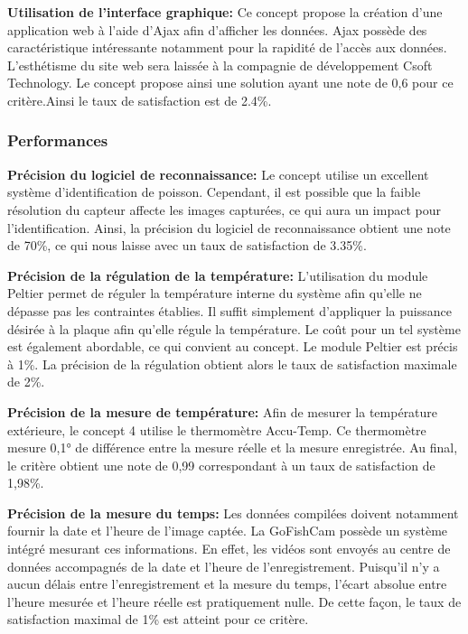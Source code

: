 \textbf{Utilisation de l'interface graphique:} Ce concept propose la création d'une application web à l'aide d'Ajax afin d'afficher les données. Ajax possède des caractéristique intéressante notamment pour la rapidité de l'accès aux données. L'esthétisme du site web sera laissée à la compagnie de développement Csoft Technology. Le concept propose ainsi une solution ayant une note de 0,6 pour ce critère.Ainsi le taux de satisfaction est de 2.4\%.


\subsubsection{Performances}

\textbf{Précision du logiciel de reconnaissance:} Le concept utilise un excellent système d'identification de poisson. Cependant, il est possible que la faible résolution du capteur affecte les images capturées, ce qui aura un impact pour l'identification. Ainsi, la précision du logiciel de reconnaissance obtient une note de 70\%, ce qui nous laisse avec un taux de satisfaction de 3.35\%. \vspace{5mm}

\textbf{Précision de la régulation de la température:} L'utilisation du module Peltier permet de réguler la température interne du système afin qu'elle ne dépasse pas les contraintes établies. Il suffit simplement d'appliquer la puissance désirée à la plaque afin qu'elle régule la température. Le coût pour un tel système est également abordable, ce qui convient au concept. Le module Peltier est précis à 1\%. La précision de la régulation obtient alors le taux de satisfaction maximale de 2\%.
\vspace{5mm}

\textbf{Précision de la mesure de température:} Afin de mesurer la température extérieure, le concept 4 utilise le thermomètre Accu-Temp. Ce thermomètre mesure 0,1° de différence entre la mesure réelle et la mesure enregistrée. Au final, le critère obtient une note de 0,99 correspondant à un taux de satisfaction de 1,98\%.
\vspace{5mm}

\textbf{Précision de la mesure du temps:} Les données compilées doivent notamment fournir la date et l'heure de l'image captée. La GoFishCam possède un système intégré mesurant ces informations. En effet, les vidéos sont envoyés au centre de données accompagnés de la date et l'heure de l'enregistrement. Puisqu'il n'y a aucun délais entre l'enregistrement et la mesure du temps, l'écart absolue entre l'heure mesurée et l'heure réelle est pratiquement nulle. De cette façon, le taux de satisfaction maximal de 1\% est atteint pour ce critère. 


